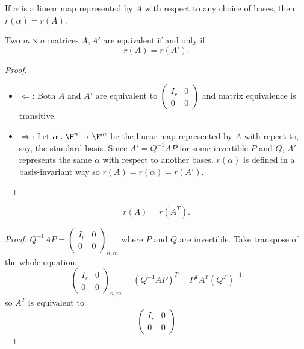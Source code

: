 \documentclass[a4paper]{article}
\theoremstyle{definition}
\begin{document}
\begin{note}
  If \(\alpha\) is a linear map represented by \(A\) with respect to any choice of bases, then \(r(\alpha) = r(A)\).
\end{note}

\begin{proposition}
  Two \(m\times n\) matrices \(A, A'\) are equivalent if and only if
  \[
    r(A) = r(A').
  \]
\end{proposition}

\begin{proof}\leavevmode
  \begin{itemize}
  \item \(\Leftarrow\): Both \(A\) and \(A'\) are equivalent to \(
    \begin{pmatrix}
      I_r & 0 \\
      0 & 0
    \end{pmatrix}
    \) and matrix equivalence is transitive.
  \item \(\Rightarrow\): Let \(\alpha:\F^n\to \F^m\) be the linear map represented by \(A\) with repect to, say, the standard basis. Since \(A'=Q^{-1}AP\) for some invertible \(P\) and \(Q\), \(A'\) represents the same \(\alpha\) with respect to another bases. \(r(\alpha)\) is defined in a basis-invariant way so \(r(A) = r(\alpha) = r(A')\).
  \end{itemize}
\end{proof}

\begin{theorem}
  \label{thm:upper corner matrix}
  \[
    r(A) = r(A^T).
  \]
\end{theorem}

\begin{proof} \(
    Q^{-1}AP =
    \begin{pmatrix}
      I_r & 0 \\
      0 & 0
    \end{pmatrix}_{n,m}
  \) where \(P\) and \(Q\) are invertible. Take transpose of the whole equation:
  \[
    \begin{pmatrix}
      I_r & 0 \\
      0 & 0
    \end{pmatrix}_{n,m}
    =(Q^{-1}AP)^T = P^TA^T(Q^T)^{-1}
  \]
  so \(A^T\) is equivalent to
  \[
      \begin{pmatrix}
      I_r & 0 \\
      0 & 0
    \end{pmatrix}
  \]
\end{proof}
\end{document}
